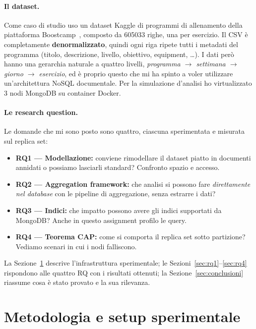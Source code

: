 \documentclass{article}
\begin{document}
\paragraph{Il dataset.} Come caso di studio uso un dataset Kaggle di programmi di
allenamento della piattaforma Boostcamp~\cite{BoostcampDataset}, composto da
\num{605033} righe, una per esercizio. Il CSV è completamente
\textbf{denormalizzato}, quindi ogni riga ripete tutti i metadati del programma
(titolo, descrizione, livello, obiettivo, equipment, \dots). I dati però hanno una
gerarchia naturale a quattro livelli,
\emph{programma $\rightarrow$ settimana $\rightarrow$ giorno $\rightarrow$ esercizio},
ed è proprio questo che mi ha spinto a voler utilizzare un'architettura NoSQL
documentale. Per la simulazione d'analisi ho virtualizzato 3 nodi MongoDB su
container Docker.

\paragraph{Le research question.} Le domande che mi sono posto sono quattro,
ciascuna sperimentata e misurata sul replica set:
\begin{itemize}
    \item \textbf{RQ1 --- Modellazione:} conviene rimodellare il dataset piatto in
    documenti annidati o possiamo lasciarli standard? Confronto spazio e accesso.
    \item \textbf{RQ2 --- Aggregation framework:} che analisi si possono fare
    \emph{direttamente nel database} con le pipeline di aggregazione, senza
    estrarre i dati?
    \item \textbf{RQ3 --- Indici:} che impatto possono avere gli indici supportati
    da MongoDB? Anche in questo assignment profilo le query.
    \item \textbf{RQ4 --- Teorema CAP:} come si comporta il replica set sotto
    partizione? Vediamo scenari in cui i nodi falliscono.
\end{itemize}

La Sezione~\ref{sec:metodo} descrive l'infrastruttura sperimentale; le
Sezioni~\ref{sec:rq1}--\ref{sec:rq4} rispondono alle quattro RQ con i risultati
ottenuti; la Sezione~\ref{sec:conclusioni} riassume cosa è stato provato e la sua
rilevanza.

\section{Metodologia e setup sperimentale}
\label{sec:metodo}
\end{document}
